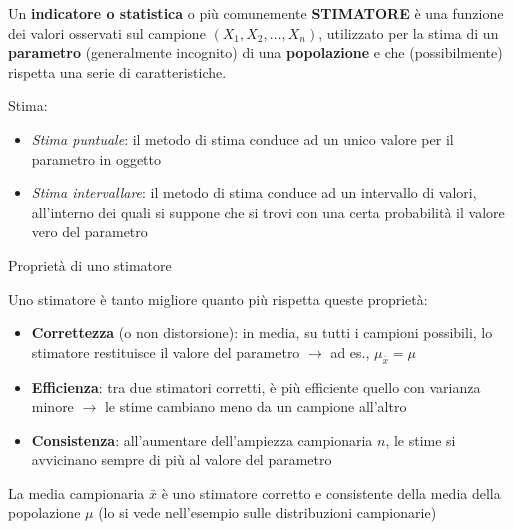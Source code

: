 \documentclass[
  ignorenonframetext,
  compress, aspectratio=149]{beamer}
\providecommand{\tightlist}{%
  \setlength{\itemsep}{0pt}\setlength{\parskip}{0pt}}
\begin{document}
\begin{frame}{}
\label{section-7}
Un \textbf{indicatore o statistica} o più comunemente \textbf{STIMATORE}
è una funzione dei valori osservati sul campione
\((X_1, X_2, \ldots, X_n)\), utilizzato per la stima di un
\textbf{parametro} (generalmente incognito) di una \textbf{popolazione}
e che (possibilmente) rispetta una serie di caratteristiche.

\vspace{3mm}

Stima:

\begin{itemize}
\tightlist
\item
  \emph{Stima puntuale}: il metodo di stima conduce ad un unico valore
  per il parametro in oggetto
\item
  \emph{Stima intervallare}: il metodo di stima conduce ad un intervallo
  di valori, all'interno dei quali si suppone che si trovi con una certa
  probabilità il valore vero del parametro
\end{itemize}
\end{frame}

\begin{frame}{Proprietà di uno stimatore}
\label{proprietuxe0-di-uno-stimatore}
\footnotesize

Uno stimatore è tanto migliore quanto più rispetta queste proprietà:

\vspace{2mm}

\begin{itemize}
\tightlist
\item
  \textbf{Correttezza} (o non distorsione): in media, su tutti i
  campioni possibili, lo stimatore restituisce il valore del parametro
  \textcolor{evid}{$\rightarrow$} ad es., \(\mu_{\bar{x}} = \mu\)
\end{itemize}

\vspace{1mm}

\begin{itemize}
\tightlist
\item
  \textbf{Efficienza}: tra due stimatori corretti, è più efficiente
  quello con varianza minore \textcolor{evid}{$\rightarrow$} le stime
  cambiano meno da un campione all'altro
\end{itemize}

\vspace{1mm}

\begin{itemize}
\tightlist
\item
  \textbf{Consistenza}: all'aumentare dell'ampiezza campionaria \(n\),
  le stime si avvicinano sempre di più al valore del parametro
\end{itemize}

\vspace{3mm}

La media campionaria \(\bar{x}\) è uno stimatore corretto e consistente
della media della popolazione \(\mu\) (lo si vede nell'esempio sulle
distribuzioni campionarie)
\end{frame}
\end{document}
